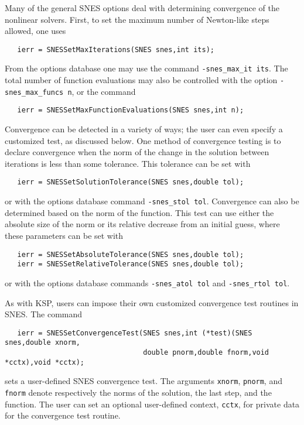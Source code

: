Many of the general SNES options deal with determining convergence
of the nonlinear solvers.  
First, to set the maximum number of Newton-like steps allowed, 
one uses 
\begin{verbatim}
   ierr = SNESSetMaxIterations(SNES snes,int its);
\end{verbatim}
From the options database one may use the command {\tt -snes\_max\_it its}.
The total number of function evaluations may also be controlled with the 
option {\tt -snes\_max\_funcs n}, or the command
\begin{verbatim}
   ierr = SNESSetMaxFunctionEvaluations(SNES snes,int n);
\end{verbatim}
 

Convergence can be detected in a variety of ways; the user can even 
specify a customized test, as discussed below. One method
of convergence testing is
to declare convergence when the norm of the change in the solution between 
iterations is less than some tolerance. This tolerance can be set
with 
\begin{verbatim}
   ierr = SNESSetSolutionTolerance(SNES snes,double tol);
\end{verbatim}
or with the options database command {\tt -snes\_stol tol}. 
Convergence can also be determined based on the norm of the function.
This test can use either the absolute size of the norm or its relative 
decrease from an initial guess, where these parameters can be set
with  
\begin{verbatim}
   ierr = SNESSetAbsoluteTolerance(SNES snes,double tol);
   ierr = SNESSetRelativeTolerance(SNES snes,double tol);
\end{verbatim}
or with the options database commands
{\tt -snes\_atol tol} and {\tt -snes\_rtol tol}.
 

As with KSP, users can impose their own customized convergence test routines
in SNES.
The command 
\begin{verbatim}
   ierr = SNESSetConvergenceTest(SNES snes,int (*test)(SNES snes,double xnorm,
                                 double pnorm,double fnorm,void *cctx),void *cctx);
\end{verbatim}
sets a user-defined SNES convergence test.  
The arguments {\tt xnorm}, {\tt pnorm}, and {\tt fnorm} denote respectively
the norms of the solution, the last step, and the function.
The user can set an optional user-defined context,
{\tt cctx}, for private data for the convergence test routine.

